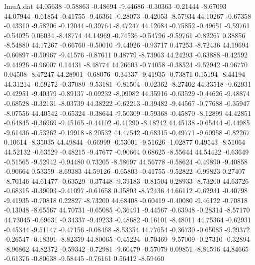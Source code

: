 \begin{filecontents}{ImuA.dat}
  44.05638   -0.58863   -0.48694   -9.44686   -0.30363   -0.21444   -8.67093
  44.07944   -0.61854   -0.41755   -9.46361   -0.28073   -0.42053   -8.57934
  44.10267   -0.67358   -0.43310   -9.58206   -0.12044   -0.39764   -8.47247
  44.12684   -0.75852   -0.49651   -9.59761   -0.54025    0.06034   -8.48774
  44.14969   -0.74536   -0.54796   -9.59761   -0.82267    0.38856   -8.54880
  44.17267   -0.66760   -0.50010   -9.44926   -0.93717    0.47253   -8.72436
  44.19694   -0.60897   -0.50967   -9.41576   -0.87611    0.48779   -8.73963
  44.24293   -0.63888   -0.42592   -9.44926   -0.96007    0.14431   -8.48774
  44.26603   -0.74058   -0.38524   -9.52942   -0.96770    0.04508   -8.47247
  44.28901   -0.68076   -0.34337   -9.41935   -0.73871    0.15194   -8.44194
  44.31214   -0.69272   -0.37089   -9.53181   -0.81504   -0.02362   -8.27402
  44.33518   -0.62931   -0.42951   -9.40379   -0.89137   -0.09232   -8.09082
  44.35916   -0.63529   -0.44626   -9.48874   -0.68528   -0.32131   -8.03739
  44.38222   -0.62213   -0.39482   -9.44567   -0.77688   -0.35947   -8.07556
  44.40542   -0.65324   -0.38644   -9.50309   -0.59368   -0.45870   -8.12899
  44.42851   -0.64845   -0.36969   -9.45165   -0.44102   -0.41290   -8.18242
  44.45138   -0.65444   -0.44985   -9.61436   -0.53262   -0.19918   -8.20532
  44.47542   -0.68315   -0.49771   -9.60958   -0.82267    0.10614   -8.35035
  44.49844   -0.66999   -0.53001   -9.51626   -1.02877    0.49543   -8.51064
  44.52132   -0.63529   -0.48215   -9.47677   -0.90664    0.68625   -8.55644
  44.54422   -0.63649   -0.51565   -9.52942   -0.94480    0.73205   -8.58697
  44.56778   -0.58624   -0.49890   -9.40858   -0.90664    0.53359   -8.69383
  44.59126   -0.65803   -0.41755   -9.52822   -0.99823    0.27407   -8.70146
  44.61477   -0.63529   -0.37448   -9.39183   -0.81504    0.28933   -8.73200
  44.63726   -0.68315   -0.39003   -9.41097   -0.61658    0.35803   -8.72436
  44.66112   -0.62931   -0.40798   -9.41935   -0.70818    0.22827   -8.73200
  44.68408   -0.60419   -0.40080   -9.46122   -0.70818   -0.13048   -8.65567
  44.70731   -0.65085   -0.36491   -9.44567   -0.63948   -0.28314   -8.57170
  44.73045   -0.69631   -0.34337   -9.49233   -0.48682   -0.16101   -8.48011
  44.75364   -0.62931   -0.45344   -9.51147   -0.47156   -0.08468   -8.53354
  44.77654   -0.36730   -0.65085   -9.29372   -0.26547   -0.18391   -8.82359
  44.80065   -0.45224   -0.70469   -9.57009   -0.27310   -0.32894   -8.96862
  44.82372   -0.59342   -0.72981   -9.60479   -0.57079    0.09851   -8.81596
  44.84665   -0.61376   -0.80638   -9.58445   -0.76161    0.56412   -8.59460

\end{filecontents}

